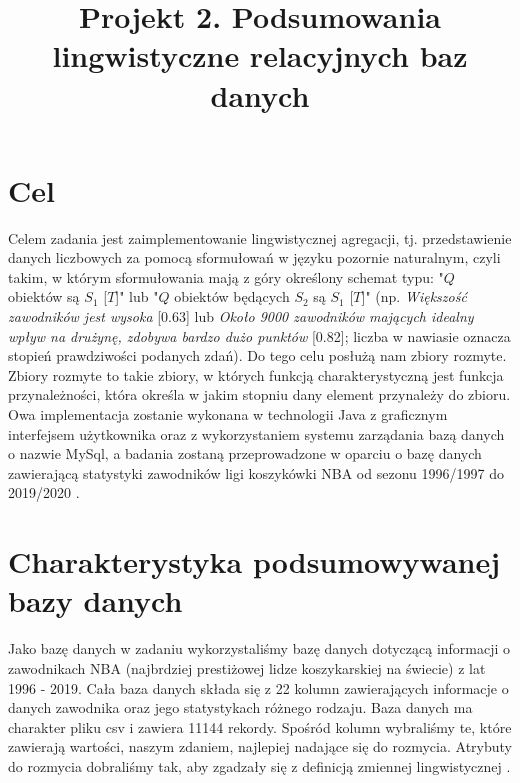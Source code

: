\documentclass{classrep}
\author{
  \studentinfo{Hubert Gawłowski}{224298} \and
  \studentinfo{Kamil Kiszko-Zgierski}{224328} }
\title{Projekt 2.  Podsumowania lingwistyczne relacyjnych baz danych}
\begin{document}
\maketitle
\section{Cel}
Celem zadania jest zaimplementowanie lingwistycznej agregacji, tj. przedstawienie danych liczbowych za pomocą sformułowań w języku pozornie naturalnym, czyli takim, w którym sformułowania mają z góry określony schemat typu: "$Q$ obiektów są $S_1$ [$T$]" lub "$Q$ obiektów będących $S_2$ są $S_1$ [$T$]" \cite{niewiadomski08}(np. \textit{Większość zawodników jest wysoka} [0.63] lub \textit{Około 9000 zawodników mających idealny wpływ na drużynę, zdobywa bardzo dużo punktów} [0.82]; liczba w nawiasie oznacza stopień prawdziwości podanych zdań). Do tego celu posłużą nam zbiory rozmyte. Zbiory rozmyte to takie zbiory, w których funkcją charakterystyczną jest funkcja przynależności, która określa w jakim stopniu dany element przynależy do zbioru. Owa implementacja zostanie wykonana w technologii Java z graficznym interfejsem użytkownika oraz z wykorzystaniem systemu zarządania bazą danych o nazwie MySql, a badania zostaną przeprowadzone w oparciu o bazę danych zawierającą statystyki zawodników ligi koszykówki NBA od sezonu 1996/1997 do 2019/2020 \cite{nba_data}.  \\


\section{Charakterystyka podsumowywanej bazy danych}

Jako bazę danych w zadaniu wykorzystaliśmy bazę danych dotyczącą informacji o zawodnikach NBA (najbrdziej prestiżowej lidze koszykarskiej na świecie) z lat 1996 - 2019. Cała baza danych składa się z 22 kolumn zawierających informacje o danych zawodnika oraz jego statystykach różnego rodzaju. Baza danych ma charakter pliku csv i zawiera 11144 rekordy. Spośród kolumn wybraliśmy te, które zawierają wartości, naszym zdaniem, najlepiej nadające się do rozmycia. Atrybuty do rozmycia dobraliśmy tak, aby zgadzały się z definicją zmiennej lingwistycznej \cite{niewiadomski19}. \\
\end{document}
